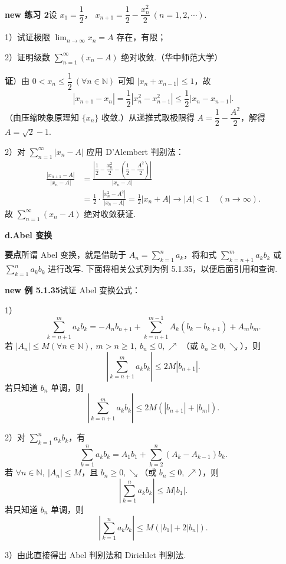 \documentclass[UTF8, 12pt, fontset=fandol, oneside]{ctexart}
\begin{document}
\noindent\textbf{new 练习 2}\quad 设 $x_1=\dfrac12$，
$x_{n+1}=\dfrac12-\dfrac{x_n^2}2\ (n=1,2,\cdots)$.

1）试证极限 $\displaystyle\lim_{n\to\infty}x_n=A$ 存在，有限；

2）证明级数 $\displaystyle\sum_{n=1}^{\infty}(x_n-A)$ 绝对收敛.（华中师范大学）

\noindent\textbf{证}）由 $0<x_n\le\dfrac12\ (\forall n\in\mathbb N)$ 可知 $|x_n+x_{n-1}|\le1$，故
\[
  |x_{n+1}-x_n|
  =\frac12|x_n^2-x_{n-1}^2|
  \le\frac12|x_n-x_{n-1}|.
\]
（由压缩映象原理知 $\{x_n\}$ 收敛.）从递推式取极限得
$A=\dfrac12-\dfrac{A^2}2$，解得 $A=\sqrt2-1$.

2）对 $\displaystyle\sum_{n=1}^{\infty}|x_n-A|$ 应用 D'Alembert 判别法：
\[
\begin{aligned}
  \frac{|x_{n+1}-A|}{|x_n-A|}
  &=\frac{\left|\dfrac12-\dfrac{x_n^2}2-\left(\dfrac12-\dfrac{A^2}2\right)\right|}
          {|x_n-A|}\\
  &=\frac12\cdot\frac{|x_n^2-A^2|}{|x_n-A|}
  =\frac12|x_n+A|\to |A|<1\quad(n\to\infty).
\end{aligned}
\]
故 $\displaystyle\sum_{n=1}^{\infty}(x_n-A)$ 绝对收敛获证.

\noindent\textbf{d.\quad Abel 变换}

\noindent\textbf{要点}\quad 所谓 Abel 变换，就是借助于
$A_n=\displaystyle\sum_{k=1}^n a_k$，将和式
$\displaystyle\sum_{k=n+1}^m a_kb_k$ 或
$\displaystyle\sum_{k=1}^n a_kb_k$ 进行改写. 下面将相关公式列为例 5.1.35，以便后面引用和查询.

\noindent\textbf{new 例 5.1.35}\quad 试证 Abel 变换公式：

1）
\[
  \sum_{k=n+1}^m a_kb_k
  =-A_nb_{n+1}+\sum_{k=n+1}^{m-1}A_k(b_k-b_{k+1})+A_mb_m.
\tag{A}
\]
若 $|A_n|\le M(\forall n\in\mathbb N),\ m>n\ge1,\ b_n\le0,\nearrow$
（或 $b_n\ge0,\searrow$），则
\[
  \left|\sum_{k=n+1}^m a_kb_k\right|\le2M|b_{n+1}|.
\tag{B}
\]
若只知道 $b_n$ 单调，则
\[
  \left|\sum_{k=n+1}^m a_kb_k\right|
  \le2M(|b_{n+1}|+|b_m|).
\tag{C}
\]

2）对 $\displaystyle\sum_{k=1}^n a_kb_k$，有
\[
  \sum_{k=1}^n a_kb_k=A_1b_1+\sum_{k=2}^n(A_k-A_{k-1})b_k.
\tag{$A_1$}
\]
若 $\forall n\in\mathbb N,\ |A_n|\le M$，且 $b_n\ge0,\searrow$（或 $b_n\le0,\nearrow$），则
\[
  \left|\sum_{k=1}^n a_kb_k\right|\le M|b_1|.
\tag{$B_1$}
\]
若只知道 $b_n$ 单调，则
\[
  \left|\sum_{k=1}^n a_kb_k\right|\le M(|b_1|+2|b_n|).
\tag{$C_1$}
\]

3）由此直接得出 Abel 判别法和 Dirichlet 判别法.
\end{document}
